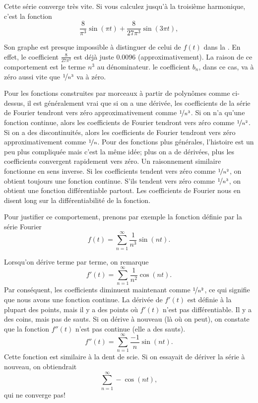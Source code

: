\begin{example}
Cette série converge très vite.
Si vous calculez jusqu'à la troisième harmonique, c'est la fonction
\begin{equation*}
\frac{8}{\pi^3} \sin (\pi t) + 
\frac{8}{27 \pi^3} \sin (3 \pi t) ,
\end{equation*}

Son graphe est presque impossible à distinguer de celui de $f(t)$ dans la 
.
En effet, le coefficient
$\frac{8}{27 \pi^3}$ est déjà juste 0.0096 (approximativement).
La raison de ce comportement est le terme $n^3$ au dénominateur.
le coefficient $b_n$, dans ce cas, va à zéro aussi vite que
$\nicefrac{1}{n^3}$ va à zéro.
\end{example}

Pour les fonctions construites par morceaux à partir de polynômes comme ci-dessus,
il est généralement vrai que si on a une dérivée, les coefficients de la série de Fourier
tendront vers zéro approximativement comme $\nicefrac{1}{n^3}$.  Si on n'a
 qu'une fonction continue, alors les coefficients de Fourier tendront vers zéro comme $\nicefrac{1}{n^2}$.  Si on a des discontinuités, alors
les coefficients de Fourier tendront vers zéro approximativement comme $\nicefrac{1}{n}$.
Pour des fonctions plus générales, l'histoire est un peu plus compliquée mais c'est la
même idée; plus on a de dérivées, plus les coefficients convergent rapidement vers zéro. Un raisonnement similaire fonctionne en sens inverse. Si les coefficients tendent vers 
zéro comme $\nicefrac{1}{n^2}$, on obtient toujours une fonction continue. S'ils tendent vers zéro comme $\nicefrac{1}{n^3}$, 
on obtient une fonction différentiable partout.  Les coefficients de Fourier nous en disent long sur la différentiabilité de la fonction. 

Pour justifier ce comportement, prenons par exemple la fonction définie par
la série Fourier
\begin{equation*}
f(t) = \sum_{n=1}^\infty \frac{1}{n^3} \sin (n t) .
\end{equation*}

Lorsqu'on dérive terme par terme, on remarque
\begin{equation*}
f'(t) = \sum_{n=1}^\infty \frac{1}{n^2} \cos (n t) .
\end{equation*}
Par conséquent, les coefficients diminuent maintenant comme $\nicefrac{1}{n^2}$, ce qui 
signifie que nous avons une fonction continue.
La dérivée de $f'(t)$ est définie à la plupart des points, mais il y a des points où $f'(t)$ n'est pas différentiable.
Il y a des coins, mais pas de sauts.
Si on dérive à nouveau (là où on peut), on constate que la fonction
$f''(t)$ n'est pas continue (elle a des sauts).
\begin{equation*}
f''(t) = \sum_{n=1}^\infty \frac{-1}{n} \sin (n t) .
\end{equation*}
Cette fonction est similaire à la dent de scie. Si on essayait de dériver 
la série à nouveau, on obtiendrait
\begin{equation*}
\sum_{n=1}^\infty -\cos (n t) ,
\end{equation*}
qui ne converge pas!

